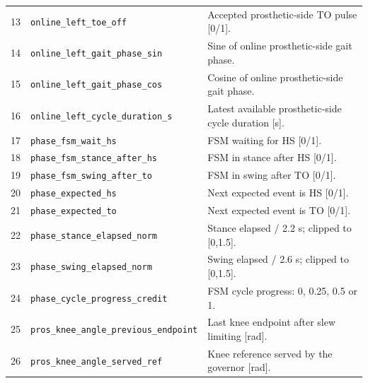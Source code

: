 {\begin{longtable}{@{}r p{7.2cm} p{7.5cm}@{}}
13 & {\fontsize{7.6}{9.2}\selectfont\texttt{online\_\allowbreak{}left\_\allowbreak{}toe\_\allowbreak{}off}} & Accepted prosthetic-side TO pulse [0/1].\\
14 & {\fontsize{7.6}{9.2}\selectfont\texttt{online\_\allowbreak{}left\_\allowbreak{}gait\_\allowbreak{}phase\_\allowbreak{}sin}} & Sine of online prosthetic-side gait phase.\\
15 & {\fontsize{7.6}{9.2}\selectfont\texttt{online\_\allowbreak{}left\_\allowbreak{}gait\_\allowbreak{}phase\_\allowbreak{}cos}} & Cosine of online prosthetic-side gait phase.\\
16 & {\fontsize{7.6}{9.2}\selectfont\texttt{online\_\allowbreak{}left\_\allowbreak{}cycle\_\allowbreak{}duration\_\allowbreak{}s}} & Latest available prosthetic-side cycle duration [s].\\
17 & {\fontsize{7.6}{9.2}\selectfont\texttt{phase\_\allowbreak{}fsm\_\allowbreak{}wait\_\allowbreak{}hs}} & FSM waiting for HS [0/1].\\
18 & {\fontsize{7.6}{9.2}\selectfont\texttt{phase\_\allowbreak{}fsm\_\allowbreak{}stance\_\allowbreak{}after\_\allowbreak{}hs}} & FSM in stance after HS [0/1].\\
19 & {\fontsize{7.6}{9.2}\selectfont\texttt{phase\_\allowbreak{}fsm\_\allowbreak{}swing\_\allowbreak{}after\_\allowbreak{}to}} & FSM in swing after TO [0/1].\\
20 & {\fontsize{7.6}{9.2}\selectfont\texttt{phase\_\allowbreak{}expected\_\allowbreak{}hs}} & Next expected event is HS [0/1].\\
21 & {\fontsize{7.6}{9.2}\selectfont\texttt{phase\_\allowbreak{}expected\_\allowbreak{}to}} & Next expected event is TO [0/1].\\
22 & {\fontsize{7.6}{9.2}\selectfont\texttt{phase\_\allowbreak{}stance\_\allowbreak{}elapsed\_\allowbreak{}norm}} & Stance elapsed / 2.2 s; clipped to [0,1.5].\\
23 & {\fontsize{7.6}{9.2}\selectfont\texttt{phase\_\allowbreak{}swing\_\allowbreak{}elapsed\_\allowbreak{}norm}} & Swing elapsed / 2.6 s; clipped to [0,1.5].\\
24 & {\fontsize{7.6}{9.2}\selectfont\texttt{phase\_\allowbreak{}cycle\_\allowbreak{}progress\_\allowbreak{}credit}} & FSM cycle progress: 0, 0.25, 0.5 or 1.\\
25 & {\fontsize{7.6}{9.2}\selectfont\texttt{pros\_\allowbreak{}knee\_\allowbreak{}angle\_\allowbreak{}previous\_\allowbreak{}endpoint}} & Last knee endpoint after slew limiting [rad].\\
26 & {\fontsize{7.6}{9.2}\selectfont\texttt{pros\_\allowbreak{}knee\_\allowbreak{}angle\_\allowbreak{}served\_\allowbreak{}ref}} & Knee reference served by the governor [rad].\\

\end{longtable}}
